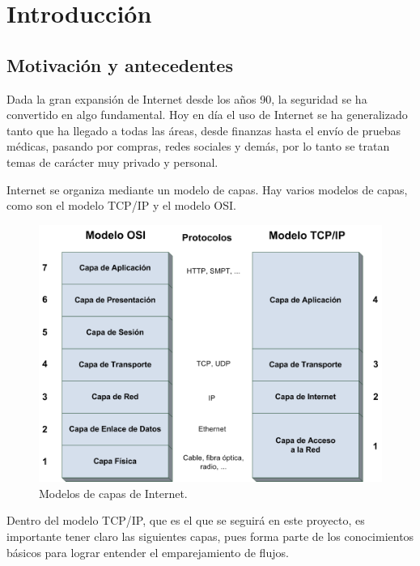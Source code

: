 \chapter{Introducción}

\section{Motivación y antecedentes}

Dada la gran expansión de Internet desde los años 90, la seguridad se ha convertido en algo 
fundamental. Hoy en día el uso de Internet se ha generalizado tanto que ha llegado a todas las áreas, 
desde finanzas hasta el envío de pruebas médicas, pasando por compras, redes sociales y demás, por lo tanto 
se tratan temas de carácter muy  privado y personal.

\intro Internet se organiza mediante un modelo de capas. Hay varios modelos de capas, como son el modelo TCP/IP y el modelo OSI. \cite{redes2010}

\begin{figure}[H]
  \includegraphics[width=1\textwidth]{imagenes/capas.png}
  \centering
  \caption{Modelos de capas de Internet.}
\end{figure}

Dentro del modelo TCP/IP, que es el que se seguirá en este proyecto, es importante tener claro las siguientes 
capas, pues forma parte de los conocimientos básicos para lograr entender el emparejamiento de flujos.

